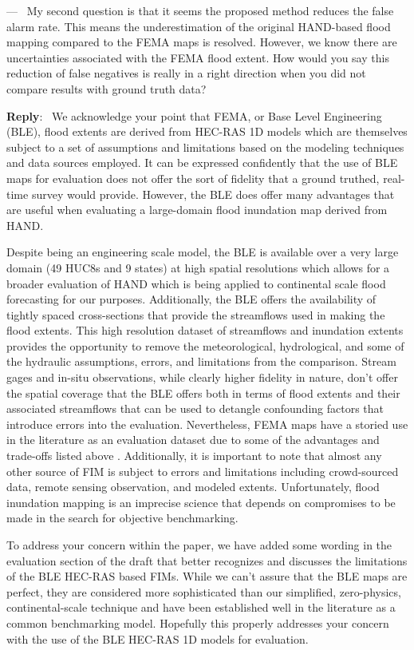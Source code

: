 \documentclass[11pt]{article}
\newcounter{reviewer}
\newcounter{point}[reviewer]
\renewcommand{\thepoint}{P\,\thereviewer.\arabic{point}}
\newenvironment{point}
   {\refstepcounter{point} \bigskip \noindent {\textbf{Reviewer~Point~\thepoint} } ---\ }
   {\par }
\newenvironment{reply}
   {\medskip \noindent \begin{sf}\textbf{Reply}:\  }
   {\medskip \end{sf}}
\begin{document}
\begin{point}
My second question is that it seems the proposed method reduces the false alarm rate.
This means the underestimation of the original HAND-based flood mapping compared to the FEMA maps is resolved.
However, we know there are uncertainties associated with the FEMA flood extent.
How would you say this reduction of false negatives is really in a right direction when you did not compare results with ground truth data?
\end{point}

\begin{reply}
We acknowledge your point that FEMA, or Base Level Engineering (BLE), flood extents are derived from HEC-RAS 1D models which are themselves subject to a set of assumptions and limitations based on the modeling techniques and data sources employed.
It can be expressed confidently that the use of BLE maps for evaluation does not offer the sort of fidelity that a ground truthed, real-time survey would provide.
However, the BLE does offer many advantages that are useful when evaluating a large-domain flood inundation map derived from HAND. 

Despite being an engineering scale model, the BLE is available over a very large domain (49 HUC8s and 9 states) at high spatial resolutions which allows for a broader evaluation of HAND which is being applied to continental scale flood forecasting for our purposes.
Additionally, the BLE offers the availability of tightly spaced cross-sections that provide the streamflows used in making the flood extents.
This high resolution dataset of streamflows and inundation extents provides the opportunity to remove the meteorological, hydrological, and some of the hydraulic assumptions, errors, and limitations from the comparison.
Stream gages and in-situ observations, while clearly higher fidelity in nature, don't offer the spatial coverage that the BLE offers both in terms of flood extents and their associated streamflows that can be used to detangle confounding factors that introduce errors into the evaluation.
Nevertheless, FEMA maps have a storied use in the literature as an evaluation dataset due to some of the advantages and trade-offs listed above \cite{cook2009effect,rajib2016large,zheng2018geoflood,afshari2018comparison,wing2017validation,criss2022stage,follum2017autorapid}.
Additionally, it is important to note that almost any other source of FIM is subject to errors and limitations including crowd-sourced data, remote sensing observation, and modeled extents.
Unfortunately, flood inundation mapping is an imprecise science that depends on compromises to be made in the search for objective benchmarking.

To address your concern within the paper, we have added some wording in the evaluation section of the draft that better recognizes and discusses the limitations of the BLE HEC-RAS based FIMs.
While we can't assure that the BLE maps are perfect, they are considered more sophisticated than our simplified, zero-physics, continental-scale technique and have been established well in the literature as a common benchmarking model.
Hopefully this properly addresses your concern with the use of the BLE HEC-RAS 1D models for evaluation.
\end{reply}
\end{document}
